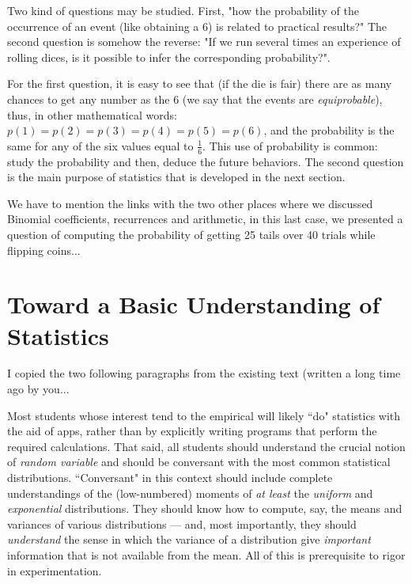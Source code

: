 Two kind of questions may be studied.
First, "how the probability of the occurrence of an event (like obtaining a $6$) is related to practical results?"
The second question is somehow the reverse: "If we run several times an experience of rolling dices, is it possible 
to infer the corresponding probability?".

For the first question, it is easy to see that (if the die is fair) there are as many chances to get any number as the $6$
(we say that the events are \textit{equiprobable}),
thus, in other mathematical words: $p(1)=p(2)=p(3)=p(4)=p(5)=p(6)$,
and the probability is the same for any of the six values equal to $\frac{1}{6}$.
This use of probability is common: study the probability and then, deduce the future behaviors.
The second question is the main purpose of statistics that is developed in the next section.


{\Denis We have to mention the links with the two other places where we discussed Binomial coefficients, recurrences and arithmetic, in this last case, we presented a question of computing the probability of getting 25 tails over 40 trials while flipping coins...}



\section{Toward a Basic Understanding of Statistics}
\label{sec:statistics}

{\Denis I copied the two following paragraphs from the existing text (written a long time ago by you...}

Most students whose interest tend to the empirical will likely ``do"
statistics with the aid of apps, rather than by explicitly writing
programs that perform the required calculations.  That said, all
students should understand the crucial notion of {\em random variable}
and should be conversant with the most common statistical
distributions.  ``Conversant" in this context should include complete
understandings of the (low-numbered) moments of {\em at least} the
{\em uniform} and {\em exponential} distributions.  They should know
how to compute, say, the means and variances of various distributions
— and, most importantly, they should {\em understand} the sense in
which the variance of a distribution give {\em important} information
that is not available from the mean.  All of this is prerequisite to
rigor in experimentation.

